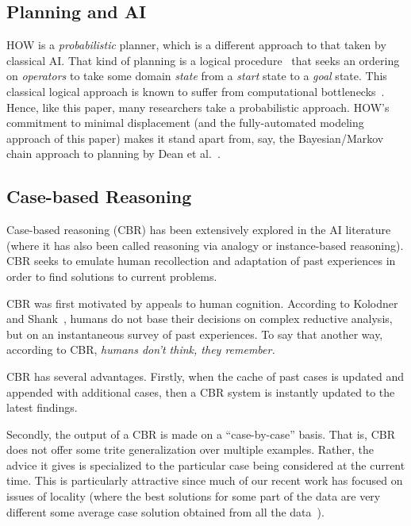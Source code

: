 \documentclass[conference]{IEEEtran}
\begin{document}
\subsection{Planning and AI}
HOW is a {\em probabilistic} planner, which is a different approach to that taken by
classical AI. 
That kind of planning is a logical procedure~\cite{Fikes1971}
that seeks an ordering on {\em operators} to take some domain
{\em state} from a {\em start} state to a {\em  goal} state.
This classical logical approach is known to suffer from
computational bottlenecks~\cite{Bylander1994}. Hence,
like this paper,
many researchers take a probabilistic approach.
HOW's commitment to minimal displacement (and the fully-automated
modeling approach of this paper) makes it stand apart from, say,
  the Bayesian/Markov chain approach to planning by Dean et al.~\cite{dean1995planning}.

\subsection{Case-based Reasoning}
Case-based reasoning (CBR) has been extensively
explored in the AI literature
(where it has also been called
 reasoning via analogy or instance-based reasoning).
CBR seeks to emulate human recollection and adaptation
of past experiences in order to find solutions to current
problems. 

CBR was first motivated by appeals to human cognition. According to 
Kolodner~\cite{Kolodner1992} and Shank~\cite{Schank1977},
humans do not base their decisions
on complex reductive analysis, but on an instantaneous survey of past experiences.
To say that   another way, according  to  CBR, 
{\em humans  don’t
think,  they remember.}



CBR has several advantages.
Firstly,
when the  cache of past cases is  updated and appended with additional cases, then a CBR system is instantly updated
to the latest findings.  

Secondly, the output of a CBR is made on a ``case-by-case'' basis. 
That is, CBR does not offer some trite generalization over multiple
examples. Rather, the advice it gives is specialized to the particular
case being considered at the current time.  This is particularly attractive
since much of our recent work has focused on issues
of locality (where the best solutions for some part of the data
are very different some average case solution obtained from all the data~\cite{localvsglobal}).  
\end{document}
